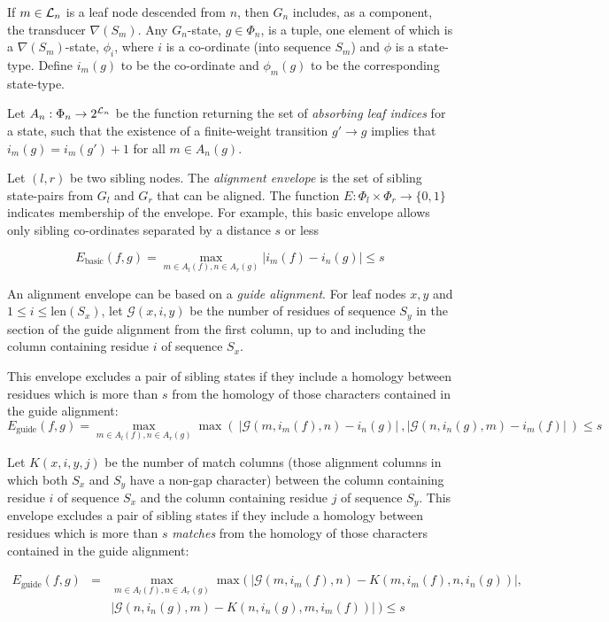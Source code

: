 \documentclass{article}
\newcommand\recognize{\nabla}
\newcommand\States{\Phi}
\newcommand\seqlen[1]{\mbox{len}(#1)}
\begin{document}
If $m \in {\cal L}_n$ is a leaf node descended from $n$,
then $G_n$ includes, as a component, the transducer $\recognize(S_m)$.
Any $G_n$-state, $g \in \States_n$, is a tuple, one element of which is a $\recognize(S_m)$-state, $\phi_i$, where $i$ is a co-ordinate (into sequence $S_m$) and $\phi$ is a state-type.
Define $i_m(g)$ to be the co-ordinate and $\phi_m(g)$ to be the corresponding state-type.

Let $A_n:\States_n \to 2^{{\cal L}_n}$ be the function returning the set of {\em absorbing leaf indices} for a state, such that the existence of a finite-weight transition $g' \to g$ implies that $i_m(g) = i_m(g') + 1$ for all $m \in A_n(g)$.

Let $(l,r)$ be two sibling nodes.
The {\em alignment envelope} is the set of sibling state-pairs from $G_l$ and $G_r$ that can be aligned.
The function $E\colon \States_l \times \States_r \to \{ 0,1 \}$ indicates membership of the envelope.
For example, this basic envelope allows only sibling co-ordinates separated by a distance $s$ or less

\[
E_{\mbox{basic}}(f,g) = \max_{m \in A_l(f), n \in A_r(g)} |i_m(f)-i_n(g)| \leq s
\]

An alignment envelope can be based on a {\em guide alignment}. 
For leaf nodes $x,y$ and $1 \leq i \leq \seqlen{S_x}$, let $\mathcal{G}(x,i,y)$ be the number of residues of sequence $S_y$
in the section of the guide alignment from the first column, up to and including the column containing residue $i$ of sequence $S_x$.

This envelope excludes a pair of sibling states if they include a homology between residues which is more than $s$ from the homology of those characters contained in the guide alignment:
\[
E_{\mbox{guide}}(f,g) = \max_{m \in A_l(f), n \in A_r(g)} \max(\ |\mathcal{G}(m,i_m(f),n)-i_n(g)| \ ,  |\mathcal{G}(n,i_n(g),m)-i_m(f)|\ ) \leq s
\]


Let $K(x,i,y,j)$ be the number of match columns (those alignment columns in which both $S_x$ and $S_y$ have a non-gap character) between the column containing residue $i$ of sequence $S_x$ and the column containing residue $j$ of sequence $S_y$.  
This envelope excludes a pair of sibling states if they include a homology between residues which is more than $s$ {\em matches} from the homology of those characters contained in the guide alignment:

\begin{align*}
E_{\mbox{guide}}(f,g) & = & \max_{m \in A_l(f), n \in A_r(g)} \max(\ |\mathcal{G}(m,i_m(f),n)-K(m,i_m(f),n,i_n(g))|, \ \\
& &|\mathcal{G}(n,i_n(g),m)-K(n,i_n(g),m,i_m(f))|\ ) \leq s
\end{align*}
\end{document}
